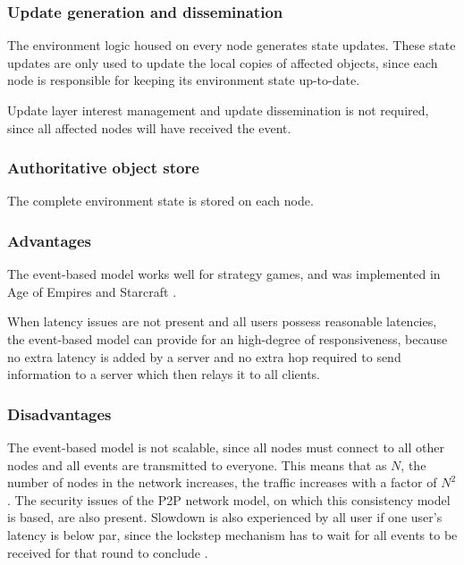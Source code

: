 \subsubsection{Update generation and dissemination}

The environment logic housed on every node generates state updates. These state updates are only used to update the local copies of affected objects, since each node is responsible for keeping its environment state up-to-date.

Update layer interest management and update dissemination is not required, since all affected nodes will have received the event.

\subsubsection{Authoritative object store}

The complete environment state is stored on each node.

\subsubsection{Advantages}
The event-based model works well for strategy games, and was implemented in Age of Empires \cite{p2p_cm_aoe} and Starcraft \cite{starcraft_network_model}.

When latency issues are not present and all users possess reasonable latencies, the event-based model can provide for an high-degree of responsiveness, because no extra latency is added by a server and no extra hop required to send information to a server which then relays it to all clients.

\subsubsection{Disadvantages}
The event-based model is not scalable, since all nodes must connect to all other nodes and all events are transmitted to
everyone. This means that as $N$, the number of nodes in the network increases, the traffic increases with a factor of $N^2$. The security issues of
the P2P network model, on which this consistency model is based, are also present. Slowdown is also experienced by all user if one user's
latency is below par, since the lockstep mechanism has to wait for all events to be received for that round to conclude \cite{cheat_proof_event_ordering}.

